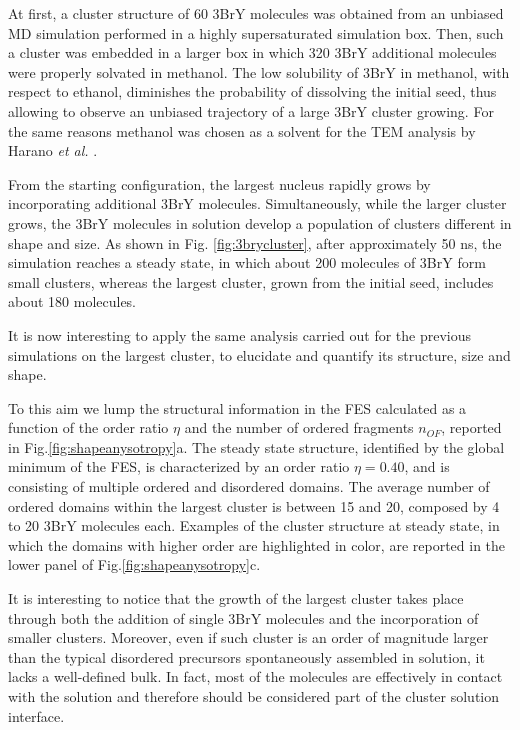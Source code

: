 \documentclass[journal=cgdefu,manuscript=article,layout=twocolumn]{achemso}
\begin{document}
At first, a cluster structure of 60 3BrY molecules was obtained from an unbiased MD simulation performed in a highly supersaturated simulation box. 
Then, such a cluster was embedded in a larger box in which 320 3BrY additional molecules were properly solvated in methanol. 
The low solubility of 3BrY in methanol, with respect to ethanol, diminishes the probability of dissolving the initial seed, thus allowing to observe an unbiased trajectory of a large 3BrY cluster growing. For the same reasons methanol was chosen as a solvent for the TEM analysis by Harano \emph{et al.} \cite{harano2012heterogeneous}.

From the starting configuration, the largest nucleus rapidly grows by incorporating additional 3BrY molecules. Simultaneously, while the larger cluster grows, the 3BrY molecules in solution develop a population of clusters different in shape and size. As shown in Fig. \ref{fig:3brycluster}, after approximately 50 ns, the simulation reaches a steady state, in which about 200 molecules of 3BrY form small clusters, whereas the largest cluster, grown from the initial seed, includes about 180 molecules. 

It is now interesting to apply the same analysis carried out for the previous simulations on the largest cluster, to elucidate and quantify its structure, size and shape. 

To this aim we lump the structural information in the FES calculated as a function of the order ratio $\eta$ and the number of ordered fragments $n_{OF}$,  reported in Fig.\ref{fig:shapeanysotropy}a. 
The steady state structure, identified by the global minimum of the FES, is characterized by an order ratio $\eta=0.40$, and is consisting of multiple ordered and disordered domains. The average number of ordered domains within the largest cluster is between 15 and 20, composed by 4 to 20 3BrY molecules each. Examples of the cluster structure at steady state, in which the domains with higher order are highlighted in color, are reported in the lower panel of Fig.\ref{fig:shapeanysotropy}c.  

It is interesting to notice that the growth of the largest cluster takes place through both the addition of single 3BrY molecules and the incorporation of smaller clusters. 
Moreover, even if such cluster is an order of magnitude larger than the typical disordered precursors spontaneously assembled in solution, it lacks a well-defined bulk. 
In fact, most of the molecules are effectively in contact with the solution and therefore should be considered part of the cluster solution interface. 
\end{document}
